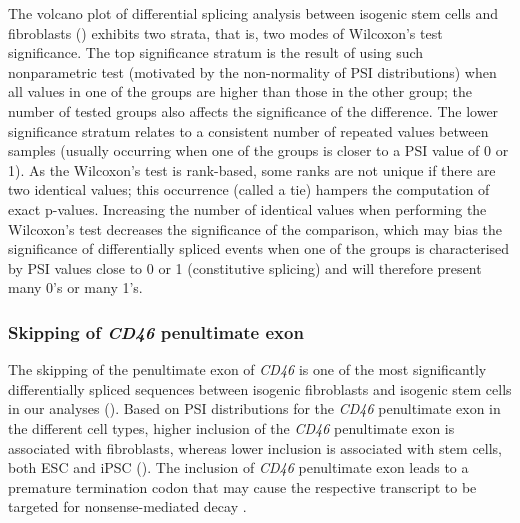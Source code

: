 The volcano plot of differential splicing analysis between isogenic stem cells and fibroblasts () exhibits two strata, that is, two modes of Wilcoxon’s test significance. The top significance stratum is the result of using such nonparametric test (motivated by the non-normality of PSI distributions) when all values in one of the groups are higher than those in the other group; the number of tested groups also affects the significance of the difference. The lower significance stratum relates to a consistent number of repeated values between samples (usually occurring when one of the groups is closer to a PSI value of 0 or 1). As the Wilcoxon’s test is rank-based, some ranks are not unique if there are two identical values; this occurrence (called a tie) hampers the computation of exact p-values. Increasing the number of identical values when performing the Wilcoxon’s test decreases the significance of the comparison, which may bias the significance of differentially spliced events when one of the groups is characterised by PSI values close to 0 or 1 (constitutive splicing) and will therefore present many 0's or many 1's.

\subsubsection{Skipping of \emph{CD46} penultimate exon}

The skipping of the penultimate exon of \emph{CD46} is one of the most significantly differentially spliced sequences between isogenic fibroblasts and isogenic stem cells in our analyses (). Based on PSI distributions for the \emph{CD46} penultimate exon in the different cell types, higher inclusion of the \emph{CD46} penultimate exon is associated with fibroblasts, whereas lower inclusion is associated with stem cells, both ESC and iPSC (). The inclusion of \emph{CD46} penultimate exon leads to a premature termination codon that may cause the respective transcript to be targeted for nonsense-mediated decay \cite{warzecha:2010wi}.

